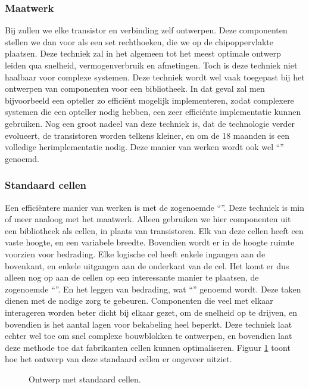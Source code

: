 \subsubsection{Maatwerk}
Bij  zullen we elke transistor en verbinding zelf ontwerpen. Deze componenten stellen we dan voor als een set rechthoeken, die we op de chipoppervlakte plaatsen. Deze techniek zal in het algemeen tot het meest optimale ontwerp leiden qua snelheid, vermogenverbruik en afmetingen. Toch is deze techniek niet haalbaar voor complexe systemen. Deze techniek wordt wel vaak toegepast bij het ontwerpen van componenten voor een bibliotheek. In dat geval zal men bijvoorbeeld een opteller zo effici\"ent mogelijk implementeren, zodat complexere systemen die een opteller nodig hebben, een zeer effici\"ente implementatie kunnen gebruiken. Nog een groot nadeel van deze techniek is, dat de technologie verder evolueert, de transistoren worden telkens kleiner, en om de 18 maanden is een volledige herimplementatie nodig. Deze manier van werken wordt ook wel ``'' genoemd.
\subsubsection{Standaard cellen}
Een effici\"entere manier van werken is met de zogenoemde ``''. Deze techniek is min of meer analoog met het maatwerk. Alleen gebruiken we hier componenten uit een bibliotheek als cellen, in plaats van transistoren. Elk van deze cellen heeft een vaste hoogte, en een variabele breedte. Bovendien wordt er in de hoogte ruimte voorzien voor bedrading. Elke logische cel heeft enkele ingangen aan de bovenkant, en enkele uitgangen aan de onderkant van de cel. Het komt er dus alleen nog op aan de cellen op een interessante manier te plaatsen, de zogenoemde ``''. En het leggen van bedrading, wat ``'' genoemd wordt. Deze taken dienen met de nodige zorg te gebeuren. Componenten die veel met elkaar interageren worden beter dicht bij elkaar gezet, om de snelheid op te drijven, en bovendien is het aantal lagen voor bekabeling heel beperkt. Deze techniek laat echter wel toe om snel complexe bouwblokken te ontwerpen, en bovendien laat deze methode toe dat fabrikanten cellen kunnen optimaliseren. Figuur \ref{fig:standardcells} toont hoe het ontwerp van deze standaard cellen er ongeveer uitziet.
\begin{figure}[hbt]
\centering
{}
\caption{Ontwerp met standaard cellen.}
\label{fig:standardcells}
\end{figure}
